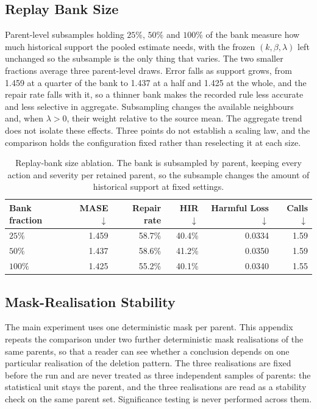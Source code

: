 \documentclass{article}
\begin{document}
\subsection{Replay Bank Size}
\label{app:replaysize}
Parent-level subsamples holding $25\%$, $50\%$ and $100\%$ of the bank measure how much
historical support the pooled estimate needs, with the frozen $(k,\beta,\lambda)$ left
unchanged so the subsample is the only thing that varies. The two smaller fractions average
three parent-level draws. Error falls as support grows, from 1.459 at a quarter of the bank to
1.437 at a half and 1.425 at the whole, and the repair rate falls with it, so a thinner bank
makes the recorded rule less accurate and less selective in aggregate. Subsampling changes
the available neighbours and, when $\lambda>0$, their weight relative to the source mean.
The aggregate trend does not isolate these effects. Three points do not
establish a scaling law, and the comparison holds the configuration fixed rather than
reselecting it at each size.

\begin{table}[htbp]
  \caption{Replay-bank size ablation. The bank is subsampled by parent, keeping
  every action and severity per retained parent, so the subsample changes the amount of
  historical support at fixed settings.}
  \label{tab:app-replaysize}
  \centering
  \small
  \setlength{\tabcolsep}{4pt}
  \begin{tabular*}{\textwidth}{@{\extracolsep{\fill}}lrrrrr@{}}
    \toprule
    Bank fraction & MASE $\downarrow$ & Repair rate & HIR $\downarrow$ & Harmful Loss $\downarrow$ & Calls $\downarrow$ \\
    \midrule
    $25\%$  & 1.459 & 58.7\% & 40.4\% & 0.0334 & 1.59 \\
    $50\%$  & 1.437 & 58.6\% & 41.2\% & 0.0350 & 1.59 \\
    $100\%$ & 1.425 & 55.2\% & 40.1\% & 0.0340 & 1.55 \\
    \bottomrule
  \end{tabular*}
\end{table}

\subsection{Mask-Realisation Stability}
\label{app:seeds}
The main experiment uses one deterministic mask per parent. This appendix repeats the
comparison under two further deterministic mask realisations of the same parents, so that a
reader can see whether a conclusion depends on one particular realisation of the deletion
pattern. The three realisations are fixed before the run and are never treated as three
independent samples of parents: the statistical unit stays the parent, and the three
realisations are read as a stability check on the same parent set. Significance testing is
never performed across them.
\end{document}

